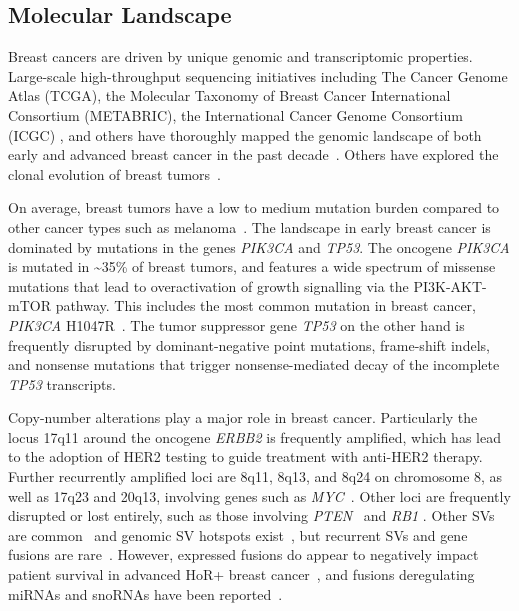 \documentclass[11pt]{book}
\begin{document}
%
%
\subsection{Molecular Landscape}
\label{subsec:breast-cancer-genomics}

Breast cancers are driven by unique genomic and transcriptomic properties. Large-scale high-throughput sequencing initiatives including The Cancer Genome Atlas (TCGA), the Molecular Taxonomy of Breast Cancer International Consortium (METABRIC), the International Cancer Genome Consortium (ICGC) \cite{ICGC:2010}, and others have thoroughly mapped the genomic landscape of both early and advanced breast cancer in the past decade~\cite{Sjoblom:2006, Curtis:2012, TCGA-Breast:2012, Nik-Zainal:2016, Pereira:2016, Staaf:2019, Campbell:2020}. Others have explored the clonal evolution of breast tumors~\cite{Nik-Zainal:2012a, Shah:2012, Yates:2015}.

On average, breast tumors have a low to medium mutation burden compared to other cancer types such as melanoma~\cite{Chalmers:2017, Alexandrov:2013, Kandoth:2013, Campbell:2020}. The landscape in early breast cancer is dominated by mutations in the genes \textit{PIK3CA} and \textit{TP53}. The oncogene \textit{PIK3CA} is mutated in \textasciitilde35\% of breast tumors, and features a wide spectrum of missense mutations that lead to overactivation of growth signalling via the PI3K-AKT-mTOR pathway. This includes the most common mutation in breast cancer, \textit{PIK3CA} H1047R~\cite{TCGA-Breast:2012, Martinez-Saez:2020}. The tumor suppressor gene \textit{TP53} on the other hand is frequently disrupted by dominant-negative point mutations, frame-shift indels, and nonsense mutations that trigger nonsense-mediated decay of the incomplete \textit{TP53} transcripts.

Copy-number alterations play a major role in breast cancer. Particularly the locus 17q11 around the oncogene \textit{ERBB2} is frequently amplified, which has lead to the adoption of HER2 testing to guide treatment with anti-HER2 therapy. Further recurrently amplified loci are 8q11, 8q13, and 8q24 on chromosome 8, as well as 17q23 and 20q13, involving genes such as \textit{MYC}~\cite{TCGA-Breast:2012}. Other loci are frequently disrupted or lost entirely, such as those involving \textit{PTEN}~\cite{Saal:2008} and \textit{RB1} \cite{Jonsson:2012}. Other SVs are common~\cite{Stephens:2009} and genomic SV hotspots exist~\cite{Fimereli:2018}, but recurrent SVs and gene fusions are rare~\cite{Edgren:2011, Robinson:2011, Banerji:2012, Fimereli:2018}. However, expressed fusions do appear to negatively impact patient survival in advanced HoR+ breast cancer~\cite{Matissek:2018}, and fusions deregulating miRNAs and snoRNAs have been reported~\cite{Persson:2017, Persson:2020}.
\end{document}
